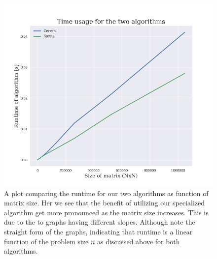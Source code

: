 \documentclass[12pt]{article}
\numberwithin{figure}{section}
\numberwithin{table}{section}
\begin{document}
\begin{figure}[ht]
\label{runtime}
\centerline{\includegraphics[scale=0.7]{runtime_comparison.png}}
	\caption{A plot comparing the runtime for our two algorithms as function of matrix size. Her we see that the benefit of utilizing our specialized algorithm get more pronounced as the matrix size increases. This is due to the to graphs having different slopes. Although note the straight form of the graphs, indicating that runtime is a linear function of the problem size $n$ as discussed above for both algorithms.}
\end{figure}
\end{document}
